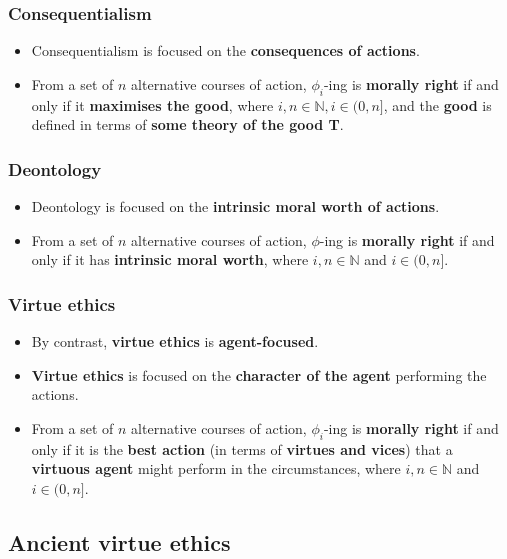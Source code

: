 \documentclass[11pt]{article}
\begin{document}
\subsubsection{Consequentialism}
\label{sec:org2553932}
\begin{itemize}
\item Consequentialism is focused on the \textbf{consequences of actions}.
\item From a set of \(n\) alternative courses of action, \(\phi_i\)-ing is \textbf{morally right} if and only if it \textbf{maximises the good}, where \(i, n \in \mathbb{N}, i \in (0, n]\), and the \textbf{good} is defined in terms of \textbf{some theory of the good T}.
\end{itemize}
\subsubsection{Deontology}
\label{sec:orgdd421b0}
\begin{itemize}
\item Deontology is focused on the \textbf{intrinsic moral worth of actions}.
\item From a set of \(n\) alternative courses of action, \(\phi\)-ing is \textbf{morally right} if and only if it has \textbf{intrinsic moral worth}, where \(i, n \in \mathbb{N}\) and \(i \in (0, n]\).
\end{itemize}
\subsubsection{Virtue ethics}
\label{sec:org8f997e1}
\begin{itemize}
\item By contrast, \textbf{virtue ethics} is \textbf{agent-focused}.
\item \textbf{Virtue ethics} is focused on the \textbf{character of the agent} performing the actions.
\item From a set of \(n\) alternative courses of action, \(\phi_i\)-ing is \textbf{morally right} if and only if it is the \textbf{best action} (in terms of \textbf{virtues and vices}) that a \textbf{virtuous agent} might perform in the circumstances, where \(i, n \in \mathbb{N}\) and \(i \in (0, n]\).
\end{itemize}
\subsection{Ancient virtue ethics}
\label{sec:orgb44626c}
\end{document}
